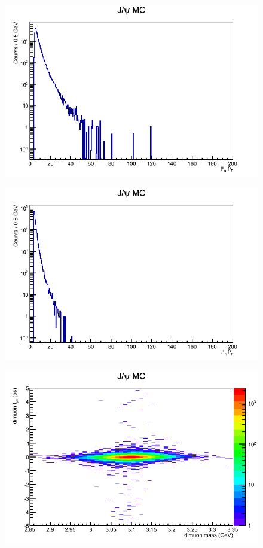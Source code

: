 \documentclass[a4paper,12pt]{article}
\begin{document}
\begin{figure}[]
    \centering
      \includegraphics[scale=0.5]{Images/mu0_pT.png}
    \caption{}
\end{figure}
\begin{figure}[]
    \centering
      \includegraphics[scale=0.5]{Images/mu1_pT.png}
    \caption{}
\end{figure}
\begin{figure}[]
    \centering
      \includegraphics[scale=0.5]{Images/dimuon_mass_vs_dimuon_tau_xy.png}
    \caption{}
\end{figure}
\end{document}
